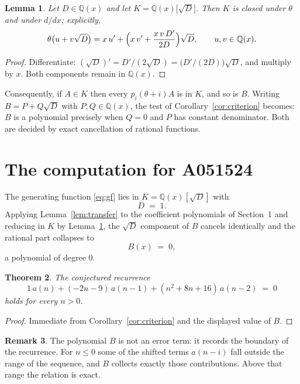 \documentclass[11pt,a4paper]{article}
\theoremstyle{plain}
\newtheorem{theorem}{Theorem}
\newtheorem{lemma}[theorem]{Lemma}
\theoremstyle{definition}
\newtheorem{remark}[theorem]{Remark}
\begin{document}
\begin{lemma}\label{lem:field}
Let $D\in\mathbb{Q}(x)$ and let $K=\mathbb{Q}(x)\bigl[\sqrt{D}\bigr]$. Then $K$ is closed
under $\theta$ and under $d/dx$; explicitly,
\[
\theta\bigl(u+v\sqrt{D}\bigr)=x\,u'+\Bigl(x\,v'+\frac{x\,v\,D'}{2D}\Bigr)\sqrt{D},
\qquad u,v\in\mathbb{Q}(x).
\]
\end{lemma}

\begin{proof}
Differentiate: $(\sqrt{D})'=D'/(2\sqrt{D})=\bigl(D'/(2D)\bigr)\sqrt{D}$, and multiply by
$x$. Both components remain in $\mathbb{Q}(x)$.
\end{proof}

Consequently, if $A\in K$ then every $p_{i}(\theta+i)A$ is in $K$, and so is $B$. Writing
$B=P+Q\sqrt{D}$ with $P,Q\in\mathbb{Q}(x)$, the test of Corollary~\ref{cor:criterion}
becomes: $B$ is a polynomial precisely when $Q=0$ and $P$ has constant denominator. Both
are decided by exact cancellation of rational functions.

\section{The computation for A051524}

The generating function \eqref{eq:gf} lies in $K=\mathbb{Q}(x)[\sqrt{D}]$ with
\[
D \;=\; 1 .
\]
Applying Lemma~\ref{lem:transfer} to the coefficient polynomials of Section~1 and reducing
in $K$ by Lemma~\ref{lem:field}, the $\sqrt{D}$ component of $B$ cancels identically and
the rational part collapses to
\[
B(x)\;=\;0 ,
\]
a polynomial of degree $0$.

\begin{theorem}
The conjectured recurrence
\[
1\,a(n) + (- 2 n - 9)\,a(n-1) + (n^{2} + 8 n + 16)\,a(n-2) \;=\;0
\]
holds for every $n>0$.
\end{theorem}

\begin{proof}
Immediate from Corollary~\ref{cor:criterion} and the displayed value of $B$.
\end{proof}

\begin{remark}
The polynomial $B$ is not an error term: it records the boundary of the recurrence. For
$n\le0$ some of the shifted terms $a(n-i)$ fall outside the range of the sequence,
and $B$ collects exactly those contributions. Above that range the relation is exact.
\end{remark}
\end{document}
